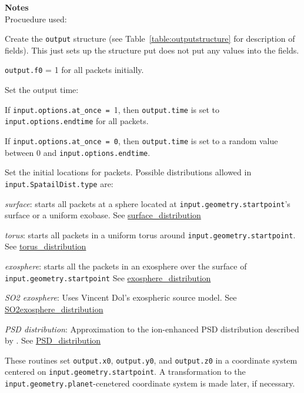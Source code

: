 \documentclass[11pt]{article}
\newcommand\descrip[1]{\textsf{\textbf{\large{#1}}}\\}
\begin{document}
\descrip{Notes}
Procuedure used:
\begin{compactenum} 
\item Create the \texttt{output} structure (see
Table~\ref{table:outputstructure} for description of fields). This just sets up
the structure put does not put any values into the fields.

\item \texttt{output.f0} = 1 for all packets initially.

\item Set the output time: \\
  \begin{compactitem} \vspace{-\baselineskip}
  \item If \texttt{input.options.at\_once = }1, then
  \texttt{output.time} is set to \texttt{input.options.endtime} for all
  packets. 
  \item If \texttt{input.options.at\_once = 0}, then \texttt{output.time} is
  set to a random value between 0 and \texttt{input.options.endtime}.
  \end{compactitem}

\item Set the initial locations for packets. Possible distributions allowed in
\texttt{input.SpatailDist.type} are:
  \begin{compactitem} 
  \item \textit{surface}: starts all packets at a sphere located at
    \texttt{input.geometry.startpoint}'s surface or a uniform exobase. See
    \hyperref[sece:surface_distribution]{surface\_distribution}
  \item \textit{torus}: starts all packets in a uniform torus around
    \texttt{input.geometry.startpoint}. 
    See \hyperref[sec:torus_distribution]{torus\_distribution}
  \item \textit{exosphere}: starts all the packets in an exosphere over the
    surface of \texttt{input.geometry.startpoint}
    See \hyperref[sec:exosphere_distribution]{exosphere\_distribution}
  \item \textit{SO2 exosphere}: Uses Vincent Dol's exospheric source model.
    See \hyperref[sec:SO2exosphere_distribution]{SO2exosphere\_distribution}
  \item \textit{PSD distribution}: Approximation to the ion-enhanced PSD
  distribution described by \citet{burger2010}. See 
  \hyperref[sec:PSD_distribution]{PSD\_distribution}
  \end{compactitem}
These routines set \texttt{output.x0}, \texttt{output.y0}, and
\texttt{output.z0} in a coordinate system centered on
\texttt{input.geometry.startpoint}. A transformation to the
\texttt{input.geometry.planet}-cenetered coordinate system is made later, if
necessary.


\end{compactenum}
\end{document}
